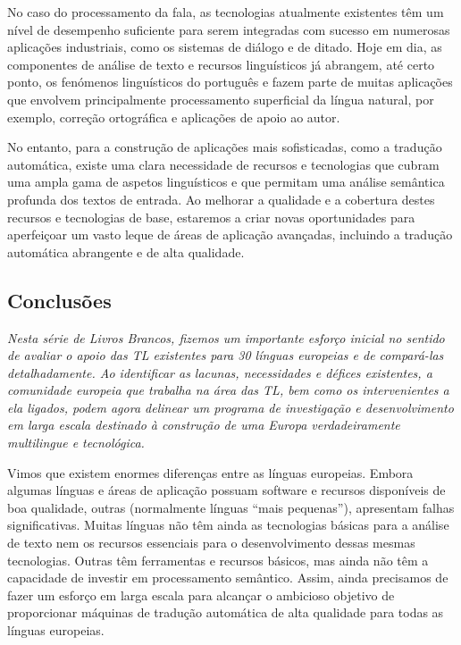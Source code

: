 \begin{multicols}{2}
No caso do processamento da fala, as tecnologias atualmente existentes têm um nível de desempenho suficiente para serem integradas com sucesso em numerosas aplicações industriais, como os sistemas de diálogo e de ditado. Hoje em dia, as componentes de análise de texto e recursos linguísticos já abrangem, até certo ponto, os fenómenos linguísticos do português e fazem parte de muitas aplicações que envolvem principalmente processamento superficial da língua natural, por exemplo, correção ortográfica e aplicações de apoio ao autor. 

No entanto, para a construção de aplicações mais sofisticadas, como a tradução automática, existe uma clara necessidade de recursos e tecnologias que cubram uma ampla gama de aspetos linguísticos e que permitam uma análise semântica profunda dos textos de entrada. Ao melhorar a qualidade e a cobertura destes recursos e tecnologias de base, estaremos a criar novas oportunidades para aperfeiçoar um vasto leque de áreas de aplicação avançadas, incluindo a tradução automática abrangente e de alta qualidade.

\subsection{Conclusões}

\emph{Nesta série de Livros Brancos, fizemos um importante esforço inicial no sentido de avaliar o apoio das TL existentes para 30 línguas europeias e de compará-las detalhadamente. Ao identificar as lacunas, necessidades e défices existentes, a comunidade europeia que trabalha na área das TL, bem como os intervenientes a ela ligados, podem agora delinear um programa de investigação e desenvolvimento em larga escala destinado à construção de uma Europa verdadeiramente multilingue e tecnológica.}

Vimos que existem enormes diferenças entre as línguas europeias. Embora algumas línguas e áreas de aplicação possuam software e recursos disponíveis de boa qualidade, outras (normalmente línguas “mais pequenas”), apresentam falhas significativas. Muitas línguas não têm ainda as tecnologias básicas para a análise de texto nem os recursos essenciais para o desenvolvimento dessas mesmas tecnologias. Outras têm ferramentas e recursos básicos, mas ainda não têm a capacidade de investir em processamento semântico. Assim, ainda precisamos de fazer um esforço em larga escala para alcançar o ambicioso objetivo de proporcionar máquinas de tradução automática de alta qualidade para todas as línguas europeias.


\end{multicols}
